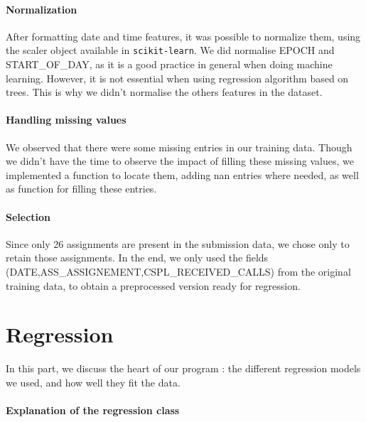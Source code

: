 \documentclass[a4paper,10pt]{article}
\begin{document}
    \subsection{Normalization}

    After formatting date and time features, it was possible to normalize them, using the scaler object available in {\tt scikit-learn}. We did normalise EPOCH and START\_OF\_DAY, as it is a good practice in general when doing machine learning. However, it is not essential when using regression algorithm based on trees. This is why we didn’t normalise the others features in the dataset.

    \subsection{Handling missing values}

    We observed that there were some missing entries in our training data. Though we didn’t have the time to observe the impact of filling these missing values, we implemented a function to locate them, adding nan entries where needed, as well as function for filling these entries.

    \subsection{Selection}

    Since only 26 assignments are present in the submission data, we chose only to retain those assignments. In the end, we only used the fields (DATE,ASS\_ASSIGNEMENT,CSPL\_RECEIVED\_CALLS) from the original training data, to obtain a preprocessed version ready for regression.

\newpage
\part{Regression}

In this part, we discuss the heart of our program : the different regression models we used, and how well they fit the data.

  \subsection{Explanation of the regression class}
\end{document}
